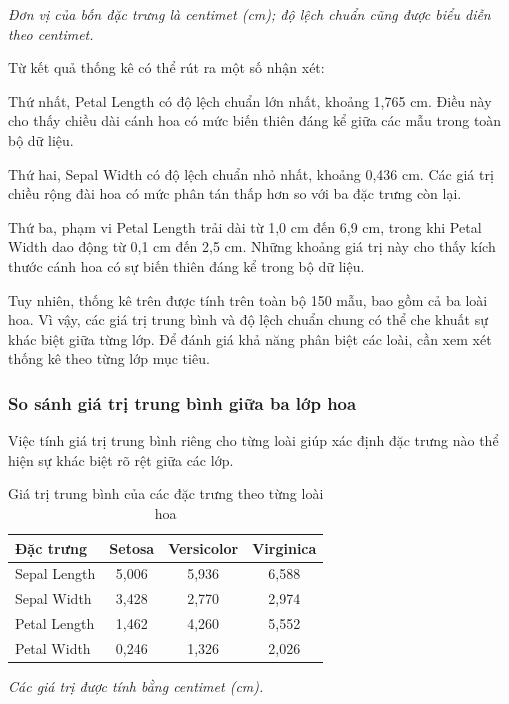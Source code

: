 \documentclass[14pt]{extarticle}
\begin{document}
	\textit{Đơn vị của bốn đặc trưng là centimet (cm); độ lệch chuẩn cũng được biểu diễn theo centimet.}
	
	Từ kết quả thống kê có thể rút ra một số nhận xét:
	
	Thứ nhất, Petal Length có độ lệch chuẩn lớn nhất, khoảng 1,765 cm. Điều này cho thấy chiều dài cánh hoa có mức biến thiên đáng kể giữa các mẫu trong toàn bộ dữ liệu.
	
	Thứ hai, Sepal Width có độ lệch chuẩn nhỏ nhất, khoảng 0,436 cm. Các giá trị chiều rộng đài hoa có mức phân tán thấp hơn so với ba đặc trưng còn lại.
	
	Thứ ba, phạm vi Petal Length trải dài từ 1,0 cm đến 6,9 cm, trong khi Petal Width dao động từ 0,1 cm đến 2,5 cm. Những khoảng giá trị này cho thấy kích thước cánh hoa có sự biến thiên đáng kể trong bộ dữ liệu.
	
	Tuy nhiên, thống kê trên được tính trên toàn bộ 150 mẫu, bao gồm cả ba loài hoa. Vì vậy, các giá trị trung bình và độ lệch chuẩn chung có thể che khuất sự khác biệt giữa từng lớp. Để đánh giá khả năng phân biệt các loài, cần xem xét thống kê theo từng lớp mục tiêu.
	
	\subsubsection{So sánh giá trị trung bình giữa ba lớp hoa}
	
	Việc tính giá trị trung bình riêng cho từng loài giúp xác định đặc trưng nào thể hiện sự khác biệt rõ rệt giữa các lớp.
	
	\begin{table}[htbp]
		\centering
		\caption{Giá trị trung bình của các đặc trưng theo từng loài hoa}
		\label{tab:iris-class-means}
		\begin{tabular}{|l|c|c|c|}
			\hline
			\textbf{Đặc trưng} &
			\textbf{Setosa} &
			\textbf{Versicolor} &
			\textbf{Virginica} \\
			\hline
			Sepal Length & 5,006 & 5,936 & 6,588 \\
			\hline
			Sepal Width & 3,428 & 2,770 & 2,974 \\
			\hline
			Petal Length & 1,462 & 4,260 & 5,552 \\
			\hline
			Petal Width & 0,246 & 1,326 & 2,026 \\
			\hline
		\end{tabular}
	\end{table}
	
	\textit{Các giá trị được tính bằng centimet (cm).}
	
\end{document}
